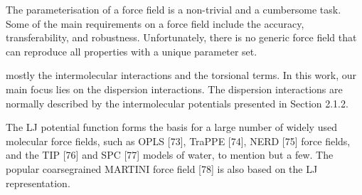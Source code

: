 The parameterisation of a force field is a non-trivial and a cumbersome task. Some of
the main requirements on a force field include the accuracy, transferability, and robustness. Unfortunately, there is no generic force field that can reproduce all properties with a
unique parameter set.



mostly the intermolecular interactions and the torsional terms. In this work, our main focus lies on the
dispersion interactions. The dispersion interactions are normally described by the intermolecular potentials presented in Section 2.1.2.

The LJ potential function forms the basis for a large number of widely
used molecular force fields, such as OPLS [73], TraPPE [74], NERD [75] force fields, and
the TIP [76] and SPC [77] models of water, to mention but a few. The popular coarsegrained MARTINI force field [78] is also based on the LJ representation.


